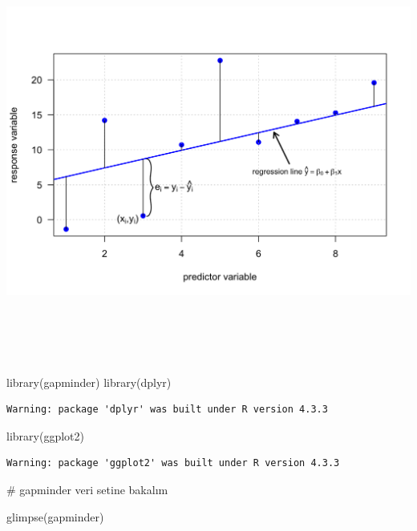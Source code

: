 \documentclass[
  letterpaper,
  DIV=11,
  numbers=noendperiod]{scrreprt}
\newenvironment{Shaded}{\begin{snugshade}}{\end{snugshade}}
\newcommand{\CommentTok}[1]{\textcolor[rgb]{0.37,0.37,0.37}{#1}}
\newcommand{\FunctionTok}[1]{\textcolor[rgb]{0.28,0.35,0.67}{#1}}
\newcommand{\NormalTok}[1]{\textcolor[rgb]{0.00,0.23,0.31}{#1}}
\begin{document}
\begin{center}
\includegraphics[width=9.375in,height=5.4375in]{images/regresyon.png}
\end{center}

\begin{Shaded}
\begin{Highlighting}[]
\FunctionTok{library}\NormalTok{(gapminder)}
\FunctionTok{library}\NormalTok{(dplyr)}
\end{Highlighting}
\end{Shaded}

\begin{verbatim}
Warning: package 'dplyr' was built under R version 4.3.3
\end{verbatim}

\begin{Shaded}
\begin{Highlighting}[]
\FunctionTok{library}\NormalTok{(ggplot2)}
\end{Highlighting}
\end{Shaded}

\begin{verbatim}
Warning: package 'ggplot2' was built under R version 4.3.3
\end{verbatim}

\begin{Shaded}
\begin{Highlighting}[]
\CommentTok{\# gapminder veri setine bakalım}

\FunctionTok{glimpse}\NormalTok{(gapminder)}
\end{Highlighting}
\end{Shaded}
\end{document}
